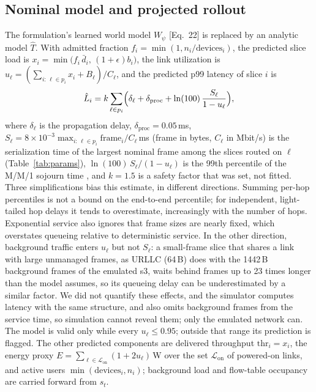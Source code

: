 \documentclass[conference]{IEEEtran}
\newcommand{\That}{\hat{T}}
\newcommand{\dbar}{\bar{d}}
\begin{document}
\subsection{Nominal model and projected rollout}
The formulation's learned world model $W_\psi$ [Eq.~22] is replaced by an analytic
model $\That$. With admitted fraction $f_i = \min(1, n_i/\text{devices}_i)$, the
predicted slice load is $x_i = \min\bigl(f_i\,\dbar_i,\,(1+\epsilon) b_i\bigr)$, the
link utilization is $u_\ell = (\sum_{i:\,\ell\in p_i} x_i + B_\ell)/C_\ell$, and the
predicted p99 latency of slice $i$ is
\begin{equation}
\hat{L}_i = k \sum_{\ell \in p_i} \Bigl( \delta_\ell + \delta_{\mathrm{proc}}
 + \ln(100)\, \frac{S_\ell}{1-u_\ell} \Bigr),
\label{eq:latency}
\end{equation}
where $\delta_\ell$ is the propagation delay, $\delta_{\mathrm{proc}} = 0.05$\,ms,
$S_\ell = 8\times10^{-3}\max_{i:\,\ell\in p_i} \mathrm{frame}_i / C_\ell$\,ms (frame in
bytes, $C_\ell$ in Mbit/s) is the serialization time of the largest nominal frame
among the slices routed on $\ell$ (Table~\ref{tab:params}), $\ln(100)\,S_\ell/(1-u_\ell)$ is the
99th percentile of the M/M/1 sojourn time \cite{kleinrock1975queueing}, and
$k = 1.5$ is a safety factor that was set, not fitted. Three simplifications bias this
estimate, in different directions. Summing per-hop percentiles is not a bound on the end-to-end percentile;
for independent, light-tailed hop delays it tends to overestimate, increasingly with
the number of hops. Exponential service also ignores that frame sizes are nearly
fixed, which overstates queueing relative to deterministic service. In the other
direction, background traffic enters $u_\ell$ but not $S_\ell$: a small-frame slice
that shares a link with large unmanaged frames, as URLLC (64\,B) does with the
1442\,B background frames of the emulated s3, waits behind frames up to 23 times
longer than the model assumes, so its queueing delay can be underestimated by a
similar factor. We did not quantify these effects, and the simulator computes latency with the same structure,
and also omits background frames from the service time, so simulation cannot
reveal them; only the emulated network can. The model is valid
only while every $u_\ell \le 0.95$; outside that range its prediction is flagged.
The other predicted components are delivered throughput $\mathrm{thr}_i = x_i$, the
energy proxy $E = \sum_{\ell \in \mathcal{L}_{\mathrm{on}}} (1 + 2u_\ell)$\,W over the set
$\mathcal{L}_{\mathrm{on}}$ of powered-on links, and
active users $\min(\text{devices}_i, n_i)$; background load and flow-table occupancy
are carried forward from $s_t$.
\end{document}
